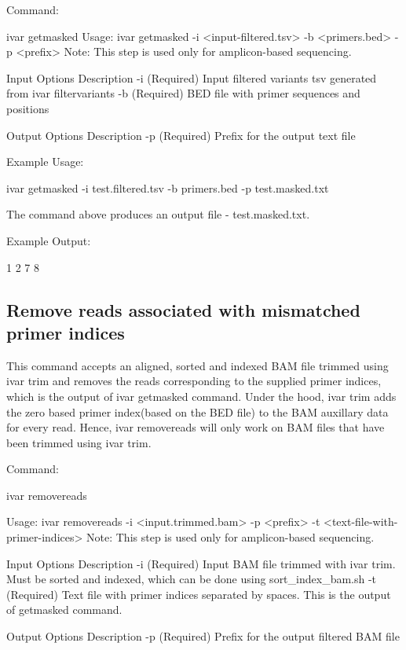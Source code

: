 Command\+: 
\begin{DoxyCode}
ivar getmasked
Usage: ivar getmasked -i <input-filtered.tsv> -b <primers.bed> -p <prefix>
Note: This step is used only for amplicon-based sequencing.

Input Options    Description
           -i    (Required) Input filtered variants tsv generated from ivar filtervariants
           -b    (Required) BED file with primer sequences and positions

Output Options   Description
           -p    (Required) Prefix for the output text file
\end{DoxyCode}


Example Usage\+: 
\begin{DoxyCode}
ivar getmasked -i test.filtered.tsv -b primers.bed -p test.masked.txt
\end{DoxyCode}


The command above produces an output file -\/ test.\+masked.\+txt.

Example Output\+:


\begin{DoxyCode}
1 2 7 8
\end{DoxyCode}
\hypertarget{manualpage_autotoc_md7}{}\subsection{Remove reads associated with mismatched primer indices}\label{manualpage_autotoc_md7}
This command accepts an aligned, sorted and indexed B\+AM file trimmed using {\ttfamily ivar trim} and removes the reads corresponding to the supplied primer indices, which is the output of {\ttfamily ivar getmasked} command. Under the hood, {\ttfamily ivar trim} adds the zero based primer index(based on the B\+E\+D file) to the B\+AM auxillary data for every read. Hence, ivar removereads will only work on B\+AM files that have been trimmed using {\ttfamily ivar trim}.

Command\+: 
\begin{DoxyCode}
ivar removereads

Usage: ivar removereads -i <input.trimmed.bam> -p <prefix> -t <text-file-with-primer-indices>
Note: This step is used only for amplicon-based sequencing.

Input Options    Description
           -i    (Required) Input BAM file  trimmed with ivar trim. Must be sorted and indexed, which can
       be done using sort\_index\_bam.sh
           -t    (Required) Text file with primer indices separated by spaces. This is the output of
       getmasked command.

Output Options   Description
           -p    (Required) Prefix for the output filtered BAM file
\end{DoxyCode}


